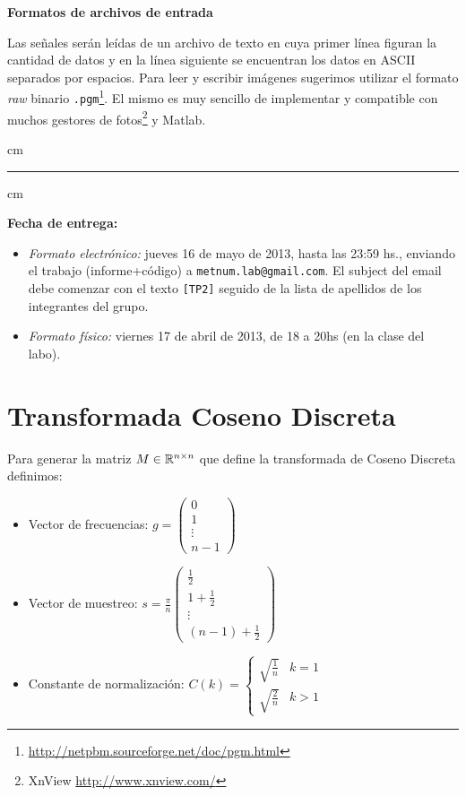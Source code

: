 {\bf Formatos de archivos de entrada}

Las se\~nales ser\'an le\'idas de un archivo de texto en cuya primer l\'inea figuran la cantidad de datos y en la l\'inea siguiente se encuentran los datos en ASCII separados por espacios. Para leer y escribir im\'agenes sugerimos utilizar el formato {\em raw} binario \texttt{.pgm}\footnote{\url{http://netpbm.sourceforge.net/doc/pgm.html}}. 
El mismo es muy sencillo de implementar y compatible con muchos gestores de fotos\footnote{XnView \url{http://www.xnview.com/}} y Matlab.

 cm
\hrule
{} cm

{\bf Fecha de entrega:} 
\begin{itemize}
\item \textsl{Formato electr\'onico:} jueves 16 de mayo de 2013, hasta las 23:59 hs., enviando el trabajo (informe+c\'odigo) a \texttt{metnum.lab@gmail.com}. El subject del email debe comenzar con el texto \verb|[TP2]| seguido de la lista de apellidos de los integrantes del grupo. 
\item \textsl{Formato f\'isico:} viernes 17 de abril de 2013, de 18 a 20hs (en la clase del labo).
\end{itemize}

\newpage
\appendix
\section{Transformada Coseno Discreta}\label{sec:dct}

Para generar la matriz $M\in\mathbb{R}^{n\times n}$ que define la transformada de Coseno Discreta definimos: 
\begin{itemize}
 \item Vector de frecuencias:  $g = \left(\begin{array}{c} 0 \\ 1 \\ \vdots \\ n-1 \end{array} \right)$
 \item Vector de muestreo: $ s= {\displaystyle \frac{\pi}{n} }\left(\begin{array}{c} \frac{1}{2} \\1+\frac{1}{2} \\  \vdots \\ (n-1)+\frac{1}{2} \end{array} \right) $
 \item Constante de normalizaci\'on: $C(k) = \left\{ \begin{array}{lr}\sqrt{\frac{1}{n}} & k=1 \\ \sqrt{\frac{2}{n}} & k > 1 \end{array} \right.$
\end{itemize}


